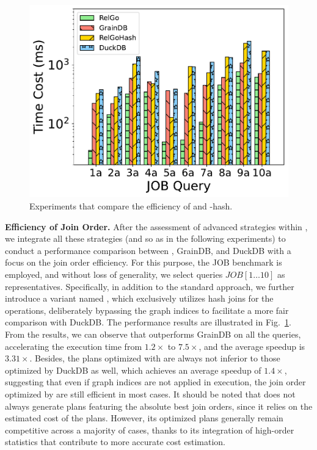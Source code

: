\begin{figure}[ht]
    \centering
    \includegraphics[width=.9\linewidth]{./figures/exp/hash_plan_job.pdf}
    \caption{Experiments that compare the efficiency of \name and \name-hash.}
    \label{fig:exp-hash-plan}
\end{figure}

\noindent\textbf{Efficiency of Join Order.}
After the assessment of advanced strategies within \name, we integrate all these strategies (and so as in the following experiments) to conduct a performance comparison between \name, GrainDB, and DuckDB with a focus on the join order efficiency.
For this purpose, the JOB benchmark is employed, and without loss of generality, we select queries $JOB[1\ldots 10]$ as representatives.
Specifically, in addition to the standard \name approach, we further introduce a variant named \relgohash, which exclusively utilizes hash joins for the \expand operations, deliberately bypassing the graph indices to facilitate a more fair comparison with DuckDB.
The performance results are illustrated in Fig.~\ref{fig:exp-hash-plan}.
From the results, we can observe that \name outperforms GrainDB on all the queries, accelerating the execution time from $1.2\times$ to $7.5\times$, and the average speedup is $3.31\times$.
Besides, the plans optimized with \relgohash are always not inferior to those optimized by DuckDB as well, which achieves an average speedup of $1.4\times$, suggesting that even if graph indices are not applied in execution, the join order optimized by \name are still efficient in most cases.
It should be noted that \name does not always generate plans featuring the absolute best join orders, since it relies on the estimated cost of the plans.
However, its optimized plans generally remain competitive across a majority of cases, thanks to its integration of high-order statistics that contribute to more accurate cost estimation.


